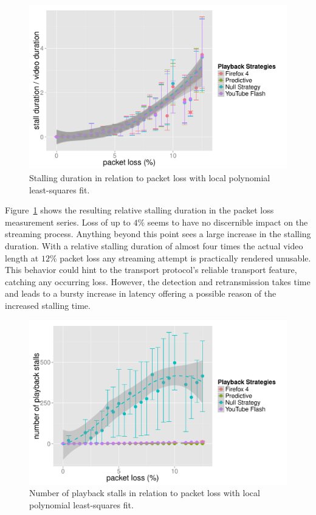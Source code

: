 \begin{figure}[htb]
    \centering
    \includegraphics[width=\textwidth]{images/R-playbackemulation-stallduration-loss.pdf}
    \caption{Stalling duration in relation to packet loss with local polynomial least-squares fit.}
    \label{c3:fig:eval-loss-stallingtime}
\end{figure}


Figure~\ref{c3:fig:eval-loss-stallingtime} shows the resulting relative stalling duration in the packet loss measurement series. Loss of up to $4\%$ seems to have no discernible impact on the streaming process. Anything beyond this point sees a large increase in the stalling duration.  With a relative stalling duration of almost four times the actual video length at $12\%$ packet loss any streaming attempt is practically rendered unusable. This behavior could hint to the transport protocol's reliable transport feature, catching any occurring loss. However, the detection and retransmission takes time and leads to a bursty increase in latency offering a possible reason of the increased stalling time.


\begin{figure}[htb]
    \centering
    \includegraphics[width=\textwidth]{images/R-playbackemulation-stallnumber-loss.pdf}
    \caption{Number of playback stalls in relation to packet loss with local polynomial least-squares fit.}
    \label{c3:fig:eval-loss-numstalls}
\end{figure}


